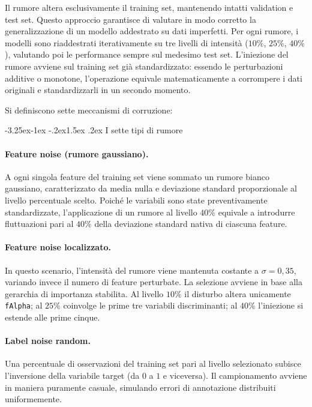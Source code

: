 \documentclass[12pt,a4paper]{article}
\makeatletter
\renewcommand\subsection{\@startsection{subsection}{2}{\z@}%
  {-3.25ex\@plus -1ex \@minus -.2ex}{1.5ex \@plus .2ex}%
  {\normalfont\large\bfseries}}
\makeatother
\begin{document}
Il rumore altera esclusivamente il training set, mantenendo intatti validation e 
test set. Questo approccio garantisce di valutare in modo corretto la 
generalizzazione di un modello addestrato su dati imperfetti. Per ogni rumore, i 
modelli sono riaddestrati iterativamente su tre livelli di intensità ($10\%$, 
$25\%$, $40\%$), valutando poi le performance sempre sul medesimo test set. 
L'iniezione del rumore avviene sul training set già standardizzato: essendo le 
perturbazioni additive o monotone, l'operazione equivale matematicamente a 
corrompere i dati originali e standardizzarli in un secondo momento.

Si definiscono sette meccanismi di corruzione:

\subsection{I sette tipi di rumore}

\paragraph{Feature noise (rumore gaussiano).} A ogni singola feature del 
training set viene sommato un rumore bianco gaussiano, caratterizzato da media 
nulla e deviazione standard proporzionale al livello percentuale scelto. Poiché 
le variabili sono state preventivamente standardizzate, l'applicazione di un 
rumore al livello $40\%$ equivale a introdurre fluttuazioni pari al $40\%$ 
della deviazione standard nativa di ciascuna feature.

\paragraph{Feature noise localizzato.} In questo scenario, l'intensità del 
rumore viene mantenuta costante a $\sigma = 0{,}35$, variando invece il numero 
di feature perturbate. La selezione avviene in base alla gerarchia di importanza 
stabilita. Al livello $10\%$ il disturbo altera unicamente \texttt{fAlpha}; al 
$25\%$ coinvolge le prime tre variabili discriminanti; al $40\%$ l'iniezione 
si estende alle prime cinque.

\paragraph{Label noise random.} Una percentuale di osservazioni del training set 
pari al livello selezionato subisce l'inversione della variabile target (da $0$ 
a $1$ e viceversa). Il campionamento avviene in maniera puramente casuale, 
simulando errori di annotazione distribuiti uniformemente.
\end{document}
